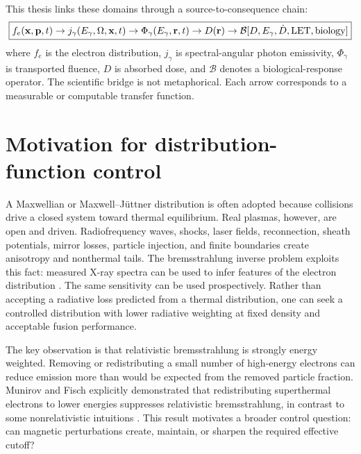 This thesis links these domains through a source-to-consequence chain:
\begin{equation}
\boxed{
 f_e(\mathbf{x},\mathbf{p},t)
 \rightarrow j_\gamma(E_{\gamma},\Omega,\mathbf{x},t)
 \rightarrow \Phi_\gamma(E_{\gamma},\mathbf{r},t)
 \rightarrow D(\mathbf{r})
 \rightarrow \mathcal{B}[D,E_{\gamma},\dot D,\mathrm{LET},\mathrm{biology}]
 }
\label{eq:source-to-biology}
\end{equation}
where $f_e$ is the electron distribution, $j_\gamma$ is spectral-angular photon emissivity, $\Phi_\gamma$ is transported fluence, $D$ is absorbed dose, and $\mathcal{B}$ denotes a biological-response operator. The scientific bridge is not metaphorical. Each arrow corresponds to a measurable or computable transfer function.

\section{Motivation for distribution-function control}

A Maxwellian or Maxwell--J\"uttner distribution is often adopted because collisions drive a closed system toward thermal equilibrium. Real plasmas, however, are open and driven. Radiofrequency waves, shocks, laser fields, reconnection, sheath potentials, mirror losses, particle injection, and finite boundaries create anisotropy and nonthermal tails. The bremsstrahlung inverse problem exploits this fact: measured X-ray spectra can be used to infer features of the electron distribution \cite{voss1992,kontar2011,swanson2018}. The same sensitivity can be used prospectively. Rather than accepting a radiative loss predicted from a thermal distribution, one can seek a controlled distribution with lower radiative weighting at fixed density and acceptable fusion performance.

The key observation is that relativistic bremsstrahlung is strongly energy weighted. Removing or redistributing a small number of high-energy electrons can reduce emission more than would be expected from the removed particle fraction. Munirov and Fisch explicitly demonstrated that redistributing superthermal electrons to lower energies suppresses relativistic bremsstrahlung, in contrast to some nonrelativistic intuitions \cite{munirov2023}. This result motivates a broader control question: can magnetic perturbations create, maintain, or sharpen the required effective cutoff?

